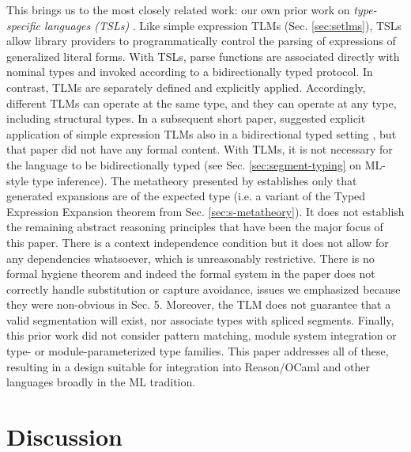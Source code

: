 \documentclass[acmsmall,screen]{acmart}
\begin{document}
This brings us to the most closely related work: our own prior work on \emph{type-specific languages (TSLs)} \cite{TSLs}. Like simple expression TLMs (Sec. \ref{sec:setlms}), TSLs allow library providers to programmatically control the parsing of expressions of generalized literal forms. With TSLs, parse functions are associated directly with nominal types and invoked according to a bidirectionally typed protocol. In contrast, TLMs are separately defined and explicitly applied. Accordingly, different TLMs can operate at the same type, and they can operate at any type, including structural types.  In a subsequent short paper, \citet{sac15} suggested explicit application of simple expression TLMs  also in a bidirectional typed setting \cite{Pierce:2000:LTI:345099.345100}, but that paper did not have any formal content. With TLMs, it is not necessary for the language to be bidirectionally typed (see Sec. \ref{sec:segment-typing} on ML-style type inference). %
The metatheory presented by \citet{TSLs} establishes only that generated expansions are of the expected type (i.e. a variant of the Typed Expression Expansion theorem from Sec. \ref{sec:s-metatheory}). It does not establish the remaining abstract reasoning principles that have been the major focus of this paper. There is a context independence condition but it does not allow for any dependencies whatsoever, which is unreasonably restrictive. There is no formal hygiene theorem and indeed the formal system in the paper does not correctly handle substitution or capture avoidance, issues we emphasized because they were non-obvious in Sec. 5. Moreover, the TLM does not guarantee that a valid segmentation will exist, nor associate types with spliced segments. Finally, this prior work did not consider pattern matching, module system integration or type- or module-parameterized type families. This paper addresses all of these, resulting in a design suitable for integration into Reason/OCaml and other languages broadly in the ML tradition.


\section{Discussion}
\label{sec:discussion}
\label{sec:conclusion}
\end{document}
